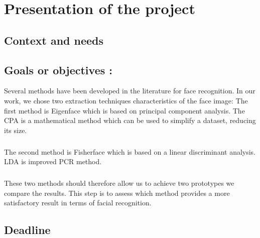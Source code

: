 \chapter{Presentation of the project}


\section{Context and needs}



\section{Goals or objectives :}
Several methods have been developed in the literature for face recognition. In our work, we chose two extraction techniques characteristics of the face image:
The first method is Eigenface which is based on principal component analysis. The CPA is a mathematical method which can be used to simplify a dataset, reducing its size.
\paragraph{}
The second method is Fisherface which is based on a linear discriminant analysis. LDA is improved PCR method.
\paragraph{}
These two methods should therefore allow us to achieve two prototypes we compare the results. This step is to assess which method provides a more satisfactory result in terms of facial recognition.



\section{Deadline}